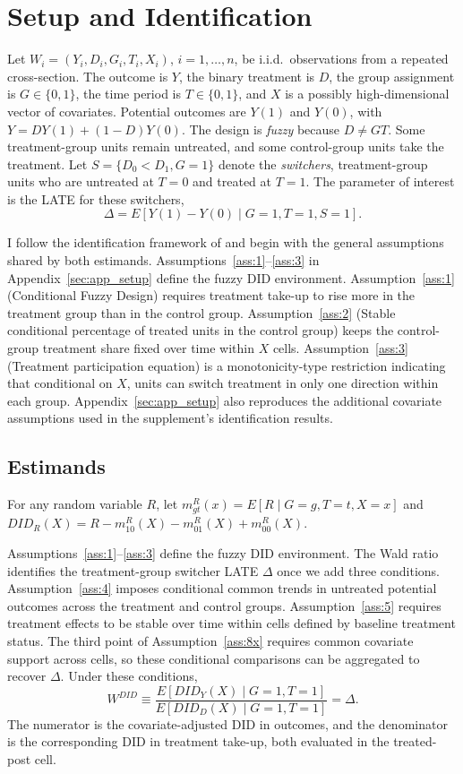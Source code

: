 \section{Setup and Identification}\label{sec:2}

Let $W_i = (Y_i, D_i, G_i, T_i, X_i)$, $i = 1,\ldots,n$, be i.i.d.\ observations from a repeated cross-section. The outcome is $Y$, the binary treatment is $D$, the group assignment is $G \in \{0,1\}$, the time period is $T \in \{0,1\}$, and $X$ is a possibly high-dimensional vector of covariates. Potential outcomes are $Y(1)$ and $Y(0)$, with $Y = DY(1) + (1-D)Y(0)$. The design is \emph{fuzzy} because $D \neq GT$. Some treatment-group units remain untreated, and some control-group units take the treatment. Let $S = \{D_0 < D_1, G=1\}$ denote the \emph{switchers}, treatment-group units who are untreated at $T=0$ and treated at $T=1$. The parameter of interest is the LATE for these switchers,
\[
    \Delta = E[Y(1) - Y(0) \mid G=1, T=1, S=1].
\]

I follow the identification framework of \citet{fuzzy2018} and begin with the general assumptions shared by both estimands. Assumptions~\ref{ass:1}--\ref{ass:3} in Appendix~\ref{sec:app_setup} define the fuzzy DID environment. Assumption~\ref{ass:1} (Conditional Fuzzy Design) requires treatment take-up to rise more in the treatment group than in the control group. Assumption~\ref{ass:2} (Stable conditional percentage of treated units in the control group) keeps the control-group treatment share fixed over time within $X$ cells. Assumption~\ref{ass:3} (Treatment participation equation) is a monotonicity-type restriction indicating that conditional on $X$, units can switch treatment in only one direction within each group. Appendix~\ref{sec:app_setup} also reproduces the additional covariate assumptions used in the supplement's identification results.


\subsection{Estimands}\label{sec:2b}

For any random variable $R$, let $m^R_{gt}(x) = E[R \mid G=g, T=t, X=x]$ and $DID_R(X) = R - m^R_{10}(X) - m^R_{01}(X) + m^R_{00}(X)$.

Assumptions~\ref{ass:1}--\ref{ass:3} define the fuzzy DID environment. The Wald ratio identifies the treatment-group switcher LATE $\Delta$ once we add three conditions. Assumption~\ref{ass:4} imposes conditional common trends in untreated potential outcomes across the treatment and control groups. Assumption~\ref{ass:5} requires treatment effects to be stable over time within cells defined by baseline treatment status. The third point of Assumption~\ref{ass:8x} requires common covariate support across cells, so these conditional comparisons can be aggregated to recover $\Delta$. Under these conditions,
\begin{equation}\label{eq:Wdid}
    W^{DID} \equiv \frac{E[DID_Y(X)\mid G=1, T=1]}{E[DID_D(X)\mid G=1, T=1]} = \Delta.
\end{equation}
The numerator is the covariate-adjusted DID in outcomes, and the denominator is the corresponding DID in treatment take-up, both evaluated in the treated-post cell.

